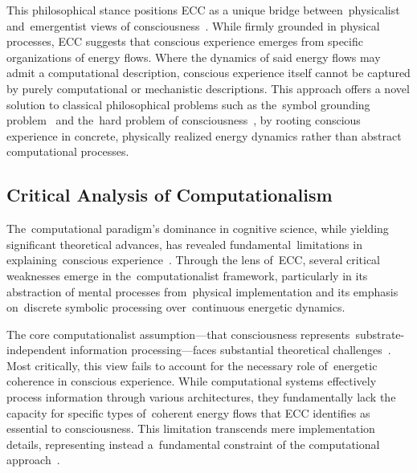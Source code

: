 This philosophical stance positions ECC as a unique bridge between~physicalist and~emergentist views of consciousness~\cite{chalmers2006strong}. While firmly grounded in physical processes, ECC suggests that conscious experience emerges from specific organizations of energy flows. Where the dynamics of said energy flows may admit a computational description, conscious experience itself cannot be captured by purely computational or mechanistic descriptions. This approach offers a novel solution to classical philosophical problems such as the~symbol grounding problem~\cite{harnad1990symbol} and the~hard problem of consciousness~\cite{chalmers1997conscious}, by rooting conscious experience in concrete, physically realized energy dynamics rather than abstract computational processes.

\subsection*{Critical Analysis of Computationalism}

The~computational paradigm's dominance in cognitive science, while yielding significant theoretical advances, has revealed fundamental~limitations in explaining~conscious experience~\cite{piccinini2020neurocognitive,anderson2024physical}. Through the lens of~ECC, several critical weaknesses emerge in the~computationalist framework, particularly in its abstraction of mental processes from~physical implementation and its emphasis on~discrete symbolic processing over~continuous energetic dynamics.

The core computationalist assumption—that consciousness represents~substrate-independent information processing—faces substantial theoretical challenges~\cite{fodor2000mind,piccinini2013neural}. Most critically, this view fails to account for the necessary role of~energetic coherence in conscious experience. While computational systems effectively process information through various architectures, they fundamentally lack the capacity for specific types of~coherent energy flows that ECC identifies as essential to consciousness. This limitation transcends mere implementation details, representing instead a~fundamental constraint of the computational approach~\cite{dreyfus1992computers,butlin2023consciousnessartificialintelligenceinsights}.

